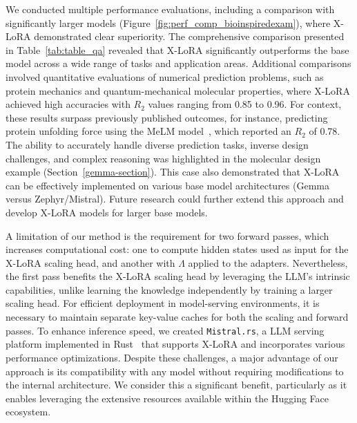 We conducted multiple performance evaluations, including a comparison with significantly larger models (Figure~\ref{fig:perf_comp_bioinspiredexam}), where X-LoRA demonstrated clear superiority. The comprehensive comparison presented in Table~\ref{tab:table_qa} revealed that X-LoRA significantly outperforms the base model across a wide range of tasks and application areas. Additional comparisons involved quantitative evaluations of numerical prediction problems, such as protein mechanics and quantum-mechanical molecular properties, where X-LoRA achieved high accuracies with $R_2$ values ranging from 0.85 to 0.96. For context, these results surpass previously published outcomes, for instance, predicting protein unfolding force using the MeLM model~\cite{Buehler2023MeLMProblemsb}, which reported an $R_2$ of 0.78. The ability to accurately handle diverse prediction tasks, inverse design challenges, and complex reasoning was highlighted in the molecular design example (Section~\ref{gemma-section}). This case also demonstrated that X-LoRA can be effectively implemented on various base model architectures (Gemma versus Zephyr/Mistral). Future research could further extend this approach and develop X-LoRA models for larger base models.

A limitation of our method is the requirement for two forward passes, which increases computational cost: one to compute hidden states used as input for the X-LoRA scaling head, and another with $\Lambda$ applied to the adapters. Nevertheless, the first pass benefits the X-LoRA scaling head by leveraging the LLM's intrinsic capabilities, unlike learning the knowledge independently by training a larger scaling head. For efficient deployment in model-serving environments, it is necessary to maintain separate key-value caches for both the scaling and forward passes. To enhance inference speed, we created \texttt{Mistral.rs}, a LLM serving platform implemented in Rust~\cite{matsakis2014rust} that supports X-LoRA and incorporates various performance optimizations. Despite these challenges, a major advantage of our approach is its compatibility with any model without requiring modifications to the internal architecture. We consider this a significant benefit, particularly as it enables leveraging the extensive resources available within the Hugging Face ecosystem.

